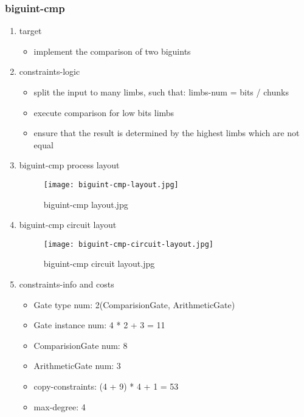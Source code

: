 \subsubsection{biguint-cmp}
\label{biguint-cmp}

\begin{enumerate}
    \item target
        \begin{itemize}
            \item implement the comparison of two biguints
        \end{itemize}
    \item constraints-logic
        \begin{itemize}
            \item split the input to many limbs, such that: limbs-num = bits / chunks
            \item execute comparison for low bits limbs
            \item ensure that the result is determined by the highest limbs which are not equal
        \end{itemize}
    \item biguint-cmp process layout
        \begin{figure}[!ht]
            \centering
            \texttt{[image: biguint-cmp-layout.jpg]}
            \caption{biguint-cmp layout.jpg}
            \label{fig:biguint-cmp-layout.jpg}
        \end{figure}
    \item biguint-cmp circuit layout
    \begin{figure}[!ht]
        \centering
        \texttt{[image: biguint-cmp-circuit-layout.jpg]}
        \caption{biguint-cmp circuit layout.jpg}
        \label{fig:biguint-cmp-circuit-layout.jpg}
    \end{figure}
    
    \item constraints-info and costs
        \begin{itemize}
            \item Gate type num: 2(ComparisionGate, ArithmeticGate)
            \item Gate instance num: 4 * 2 + 3 = 11 
            \item ComparisionGate num: 8
            \item ArithmeticGate num: 3
            \item copy-constraints: (4 + 9) * 4 + 1 = 53 
            \item max-degree: 4
        \end{itemize}

\end{enumerate}